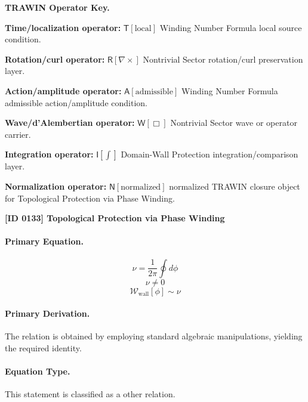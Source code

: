 \par\vspace{0.45\baselineskip}
\noindent\begin{minipage}[t]{\linewidth}
\begingroup
\small
\raggedright
\textbf{TRAWIN Operator Key.}\par
\noindent\textbf{Time/localization operator:} $\mathsf{T}\!\left[\mathrm{local}\right]$ Winding Number Formula local source condition.\par
\noindent\textbf{Rotation/curl operator:} $\mathsf{R}\!\left[\nabla\times\right]$ Nontrivial Sector rotation/curl preservation layer.\par
\noindent\textbf{Action/amplitude operator:} $\mathsf{A}\!\left[\mathrm{admissible}\right]$ Winding Number Formula admissible action/amplitude condition.\par
\noindent\textbf{Wave/d'Alembertian operator:} $\mathsf{W}\!\left[\Box\right]$ Nontrivial Sector wave or operator carrier.\par
\noindent\textbf{Integration operator:} $\mathsf{I}\!\left[\int\right]$ Domain-Wall Protection integration/comparison layer.\par
\noindent\textbf{Normalization operator:} $\mathsf{N}\!\left[\mathrm{normalized}\right]$ normalized TRAWIN closure object for Topological Protection via Phase Winding.\par
\endgroup
\end{minipage}

\clearpage
\noindent\textbf{[ID 0133] Topological Protection via Phase Winding}\par
\vspace{0.35em}
\paragraph{Primary Equation.}
\[
\nu=\frac{1}{2\pi}\oint d\phi
\]
\[
\nu\neq 0
\]
\[
\mathcal{W}_{\mathrm{wall}}[\phi]\sim \nu
\]

\paragraph{Primary Derivation.}
The relation is obtained by employing standard algebraic manipulations, yielding the required identity.
\paragraph{Equation Type.}
This statement is classified as a other relation.

